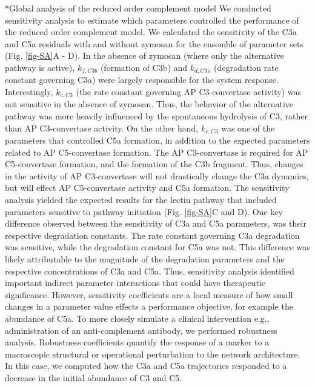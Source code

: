 \documentclass[12pt]{article}
\makeatletter
\renewcommand\subsection{\@startsection
	{subsection}{2}{0mm}
	{-0.05in}
	{-0.5\baselineskip}
	{\normalfont\normalsize\bfseries}}
\makeatother
\begin{document}
\subsection*{Global analysis of the reduced order complement model}
We conducted sensitivity analysis to estimate which parameters controlled the performance of the reduced order complement model.
We calculated the sensitivity of the C3a and C5a residuals with and without zymosan for the ensemble of parameter sets (Fig. \ref{fig-SA}A - D).
In the absence of zymosan (where only the alternative pathway is active), $k_{f,C3b}$ (formation of C3b) and $k_{d,C3a}$ (degradation rate constant governing C3a)
were largely responsible for the system response. Interestingly, $k_{c,C3}$ (the rate constant governing AP C3-convertase activity) was not sensitive in the absence of zymosan.
Thus, the behavior of the alternative pathway was more heavily influenced by the spontaneous hydrolysis of C3, rather than AP C3-convertase activity.
On the other hand, $k_{c,C3}$ was one of the parameters that controlled C5a formation, in addition to the expected parameters related to AP C5-convertase formation.
The AP C3-convertase is required for AP C5-convertase formation, and the formation of the C3b fragment.
Thus, changes in the activity of AP C3-convertase will not drastically change the C3a dynamics, but will effect AP C5-convertase activity and C5a formation.
The sensitivity analysis yielded the expected results for the lectin pathway that included parameters sensitive to pathway initiation (Fig. \ref{fig-SA}C and D).
One key difference observed between the sensitivity of C3a and C5a parameters, was their respective degradation constants.
The rate constant governing C3a degradation was sensitive, while the degradation constant for C5a was not.
This difference was likely attributable to the magnitude of the degradation parameters and the respective concentrations of C3a and C5a.
Thus, sensitivity analysis identified important indirect parameter interactions that could have therapeutic significance.
However, sensitivity coefficients are a local measure of how small changes in a parameter value effects a performance objective, for example
the abundance of C5a. To more closely simulate a clinical intervention e.g., administration of an anti-complement antibody, we performed
robustness analysis. Robustness coefficients quantify the response of a marker to a macroscopic structural or operational perturbation to the network architecture.
In this case, we computed how the C3a and C5a trajectories responded to a decrease in the initial abundance of C3 and C5.
\end{document}
